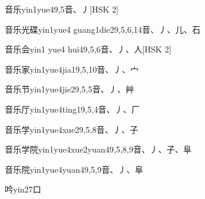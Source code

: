 \begin{EntryWithPhonetic}{音乐}{yin1yue4}{9,5}{⾳、⼃}[HSK 2]
\end{EntryWithPhonetic}

\begin{EntryWithPhonetic}{音乐光碟}{yin1yue4 guang1die2}{9,5,6,14}{⾳、⼃、⼉、⽯}
\end{EntryWithPhonetic}

\begin{EntryWithPhonetic}{音乐会}{yin1 yue4 hui4}{9,5,6}{⾳、⼃、⼈}[HSK 2]
\end{EntryWithPhonetic}

\begin{EntryWithPhonetic}{音乐家}{yin1yue4jia1}{9,5,10}{⾳、⼃、⼧}
\end{EntryWithPhonetic}

\begin{EntryWithPhonetic}{音乐节}{yin1yue4jie2}{9,5,5}{⾳、⼃、⾋}
\end{EntryWithPhonetic}

\begin{EntryWithPhonetic}{音乐厅}{yin1yue4ting1}{9,5,4}{⾳、⼃、⼚}
\end{EntryWithPhonetic}

\begin{EntryWithPhonetic}{音乐学}{yin1yue4xue2}{9,5,8}{⾳、⼃、⼦}
\end{EntryWithPhonetic}

\begin{EntryWithPhonetic}{音乐学院}{yin1yue4xue2yuan4}{9,5,8,9}{⾳、⼃、⼦、⾩}
\end{EntryWithPhonetic}

\begin{EntryWithPhonetic}{音乐院}{yin1yue4yuan4}{9,5,9}{⾳、⼃、⾩}
\end{EntryWithPhonetic}

\begin{EntryWithPhonetic}{吟}{yin2}{7}{⼝}
\end{EntryWithPhonetic}

